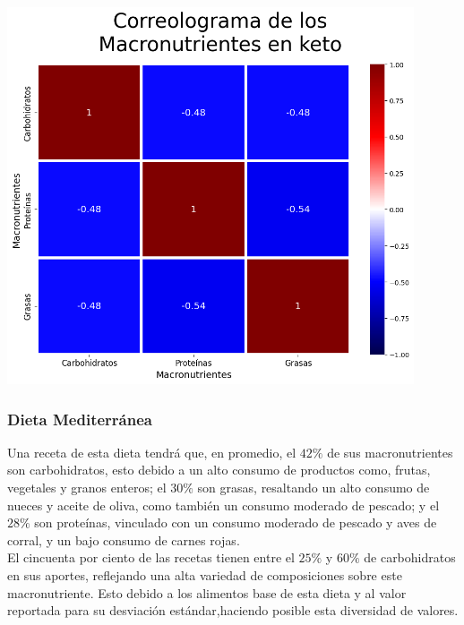 \documentclass[12pt,a4paper]{article}
\begin{document}
            \begin{center}
                \includegraphics[width=0.90\textwidth]{Resources/2_03_plot_02_4.png}
            \end{center}

        \subsubsection{Dieta Mediterránea}

            Una receta de esta dieta tendrá que, en promedio, el $42\%$ de sus 
            macronutrientes son carbohidratos, esto debido a un alto consumo de 
            productos como, frutas, vegetales y granos enteros; el $30\%$ son 
            grasas, resaltando un alto consumo de nueces y aceite de oliva, como 
            también un consumo moderado de pescado; y el $28\%$ son proteínas, 
            vinculado con un consumo moderado de pescado y aves de corral, y un 
            bajo consumo de carnes rojas.\\

            El cincuenta por ciento de las recetas tienen entre el $25\%$ y $60\%$ 
            de carbohidratos en sus aportes, reflejando una alta variedad de composiciones 
            sobre este macronutriente. Esto debido a los alimentos base de esta dieta y 
            al valor reportada para su desviación estándar,haciendo posible esta 
            diversidad de valores.\\
\end{document}
